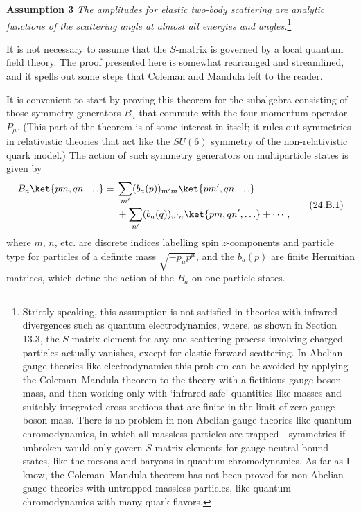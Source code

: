 \medskip
\noindent\textbf{Assumption 3}\quad
\textit{The amplitudes for elastic two-body scattering are analytic functions
of the scattering angle at almost all energies and angles.}\footnote{Strictly
speaking, this assumption is not satisfied in theories with infrared
divergences such as quantum electrodynamics, where, as shown in Section 13.3,
the $S$-matrix element for any one scattering process involving charged
particles actually vanishes, except for elastic forward scattering. In
Abelian gauge theories like electrodynamics this problem can be avoided by
applying the Coleman--Mandula theorem to the theory with a fictitious gauge
boson mass, and then working only with `infrared-safe' quantities like masses
and suitably integrated cross-sections that are finite in the limit of zero
gauge boson mass. There is no problem in non-Abelian gauge theories like
quantum chromodynamics, in which all massless particles are
trapped---symmetries if unbroken would only govern $S$-matrix elements for
gauge-neutral bound states, like the mesons and baryons in quantum
chromodynamics. As far as I know, the Coleman--Mandula theorem has not been
proved for non-Abelian gauge theories with untrapped massless particles, like
quantum chromodynamics with many quark flavors.}

It is not necessary to assume that the $S$-matrix is governed by a local
quantum field theory. The proof presented here is somewhat rearranged and
streamlined, and it spells out some steps that Coleman and Mandula left to the
reader.

It is convenient to start by proving this theorem for the subalgebra
consisting of those symmetry generators $B_a$ that commute with the
four-momentum operator $P_\mu$. (This part of the theorem is of some interest
in itself; it rules out symmetries in relativistic theories that act like the
$SU(6)$ symmetry of the non-relativistic quark model.) The action of such
symmetry generators on multiparticle states is given by
\begin{equation}
\begin{aligned}
 B_a\ket{p m,q n,\ldots}
 ={}&\sum_{m'}(b_a(p))_{m'm}\ket{p m',q n,\ldots}
 \\[-1pt]
 &+\sum_{n'}(b_a(q))_{n'n}\ket{p m,q n',\ldots}+\cdots\,,
\end{aligned}
\tag{24.B.1}\label{eq:24.B.1}
\end{equation}
where $m$, $n$, etc. are discrete indices labelling spin $z$-components and
particle type for particles of a definite mass $\sqrt{-p_\mu p^\mu}$, and the
$b_a(p)$ are finite Hermitian matrices, which define the action of the
$B_a$ on one-particle states.

